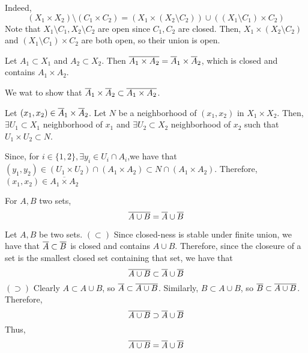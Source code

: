 

\begin{myproof}
	Indeed, $$(X_1 \times X_2)\setminus(C_1\times C_2) = (X_1\times(X_2\setminus C_2))\cup((X_1\setminus C_1)\times C_2)$$
	Note that $X_1\setminus C_1,X_2\setminus C_2$ are open since $C_1,C_2$ are closed. Then, $X_1\times(X_2\setminus C_2)$ and $(X_1\setminus C_1)\times C_2$ are both open, so their union is open.
\end{myproof}

\begin{note}
	Let $A_1\subset X_1$ and $A_2\subset X_2$. Then $\overline{A_1\times A_2} = \overline{A}_1\times\overline{A}_2$, which is closed and contains $A_1\times A_2$.
	\begin{myproof}
		We wat to show that $\overline{A}_1\times\overline{A}_2\subset \overline{A_1\times A_2}$.

		Let $(x_1,x_2)\in\overline{A}_1\times\overline{A}_2$. Let $N$ be a neighborhood of $(x_1, x_2)$ in $X_1\times X_2$. Then, $\exists U_1\subset X_1$ neighborhood of $x_1$ and $\exists U_2\subset X_2$ neighborhood of $x_2$ such that $U_1\times U_2\subset N$.

		Since, for $i\in \{1,2\},\exists y_i\in U_i\cap A_i$,we have that $(y_1, y_2)\in (U_1\times U_2)\cap(A_1\times A_2)\subset N\cap (A_1\times A_2)$. Therefore, $(x_1,x_2)\in \overline{A_1\times A_2}$
	\end{myproof}
\end{note}

\begin{note}
	For $A,B$ two sets,
	$$\overline{A\cup B} = \overline{A}\cup\overline{B}$$
	\begin{myproof}
		Let $A,B$ be two sets.
		$(\subset)$ Since closed-ness is stable under finite union, we have that $\overline{A}\subset\overline{B}$ is closed and contains $A\cup B$. Therefore, since the closeure of a set is the smallest closed set containing that set, we have that $$\overline{A\cup B}\subset \overline{A}\cup\overline{B}$$
		$(\supset)$ Clearly $A\subset A\cup B$, so $\overline{A}\subset\overline{A\cup B}$. Similarly, $B\subset A\cup B$, so $\overline{B}\subset\overline{A\cup B}$. Therefore, 
		$$\overline{A\cup B}\supset \overline{A}\cup\overline{B}$$
		Thus, $$\overline{A\cup B} = \overline{A}\cup\overline{B}$$
	\end{myproof}
\end{note}

